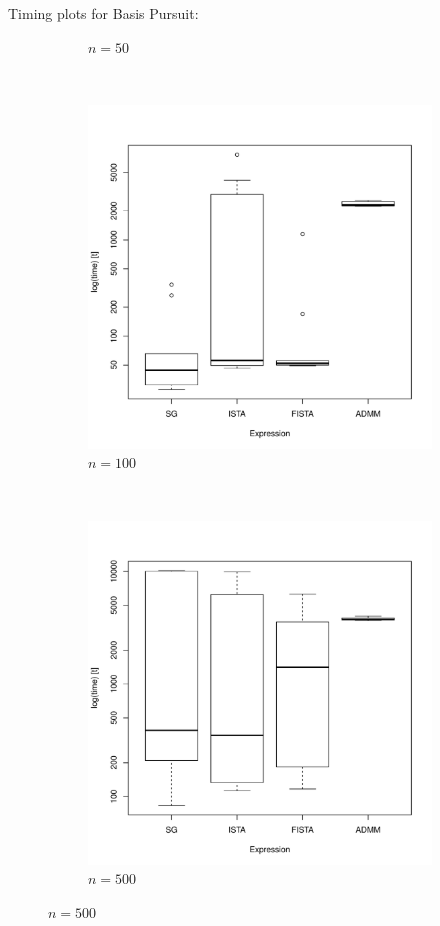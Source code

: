 \documentclass[xcolor=dvipsnames,aspectratio=1610]{beamer}
\theoremstyle{remark}
\begin{document}
\begin{frame}{Timing plots for Basis Pursuit:}
\begin{figure}[H]
\begin{subfigure}[b]{0.2\textwidth}
        \caption{$n=50$}
        \label{fig:50}
    \end{subfigure}
\\
    \begin{subfigure}[b]{0.2\textwidth}
        \includegraphics[width=\textwidth]{100timing.pdf}
        \caption{$n=100$}
        \label{fig:100}
    \end{subfigure}
~
    \begin{subfigure}[b]{0.2\textwidth}
        \includegraphics[width=\textwidth]{500timing.pdf}
        \caption{$n=500$}
        \label{fig:500}
    \end{subfigure}
\label{fig:cvgc}
\end{figure}
\end{frame}
\end{document}

